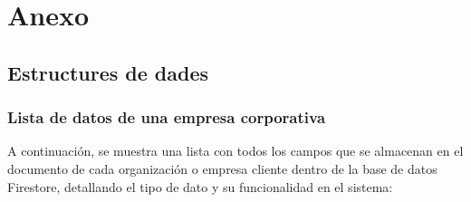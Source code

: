\chapter{Anexo} \label{chp:anexo}

\section{Estructures de dades} \label{sct:estructuras_datos}

\subsection{Lista de datos de una empresa corporativa}
A continuación, se muestra una lista con todos los campos que se almacenan en el documento de cada organización o empresa cliente dentro de la base de datos Firestore, detallando el tipo de dato y su funcionalidad en el sistema:
